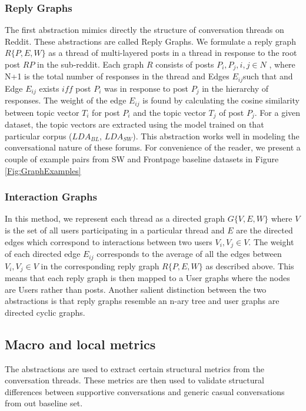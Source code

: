 \subsubsection{Reply Graphs}
\label{Sec:Reply_graphs}
The first abstraction mimics directly the structure of conversation threads on Reddit. These abstractions are called Reply Graphs. We formulate a reply graph $R\{P,E,W\}$ as a thread of multi-layered posts in a thread in response to the root post $RP$ in the sub-reddit. Each graph $R$ consists of posts $P_i , P_j , i,j \in N$ , where N+1 is the total number of responses in the thread and Edges $E_{ij}$such that and Edge $E_{ij}$ exists $iff$ post $P_i$ was in response to post $P_j$ in the hierarchy of responses.  The weight of the edge $E_{ij}$ is found by calculating the cosine similarity between topic vector $T_i$ for post $P_i$ and the topic vector $T_j$ of post $P_j$. For a given dataset, the topic vectors are extracted using the model trained on that particular corpus ($LDA_{BL}$, $LDA_{SW}$).  This abstraction works well in modeling the conversational nature of these forums.  For convenience of the reader, we present a couple of example pairs from SW and Frontpage baseline datasets in Figure \ref{Fig:GraphExamples}

\subsubsection{Interaction Graphs}
\label{Sec:Interaction_graphs}
In this method, we represent each thread as a directed graph $G\{V,E,W\}$ where $V$ is the set of all users participating in a particular thread and $E$ are the directed  edges which correspond to interactions between two users $V_i , V_j  \in V$. The weight of each directed edge $E_{ij}$ corresponds to the average of all the edges between $V_i , V_j  \in V$ in the corresponding reply graph $R\{P,E,W\}$ as described above. This means that each reply graph is then mapped to a User graphs where the nodes are Users rather than posts. Another salient distinction between the two abstractions is that reply graphs resemble an n-ary tree and user graphs are directed cyclic graphs. 





\subsection{Macro and local metrics}
The abstractions are used to extract certain structural metrics from the conversation threads. These metrics are then used to validate structural differences between supportive conversations and generic casual conversations from out baseline set.


